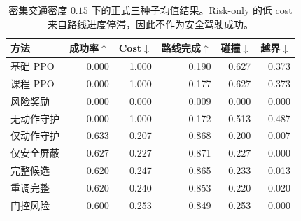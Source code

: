 \begin{table}[t]
\centering
\caption{密集交通密度 $0.15$ 下的正式三种子均值结果。Risk-only 的低 cost 来自路线进度停滞，因此不作为安全驾驶成功。}
\label{tab:formal-main-d015}
\small
\begin{tabular}{lrrrrr}
\toprule
方法 & 成功率$\uparrow$ & Cost$\downarrow$ & 路线完成$\uparrow$ & 碰撞$\downarrow$ & 越界$\downarrow$ \\
\midrule
基础 PPO & 0.000 & 1.000 & 0.190 & 0.627 & 0.373 \\
课程 PPO & 0.000 & 1.000 & 0.177 & 0.627 & 0.373 \\
风险奖励 & 0.000 & 0.000 & 0.009 & 0.000 & 0.000 \\
无动作守护 & 0.000 & 1.000 & 0.172 & 0.513 & 0.487 \\
仅动作守护 & 0.633 & 0.207 & 0.868 & 0.200 & 0.007 \\
仅安全屏蔽 & 0.627 & 0.227 & 0.871 & 0.227 & 0.000 \\
完整候选 & 0.620 & 0.247 & 0.865 & 0.233 & 0.013 \\
重调完整 & 0.620 & 0.240 & 0.853 & 0.220 & 0.020 \\
门控风险 & 0.600 & 0.253 & 0.849 & 0.253 & 0.000 \\
\bottomrule
\end{tabular}
\end{table}
